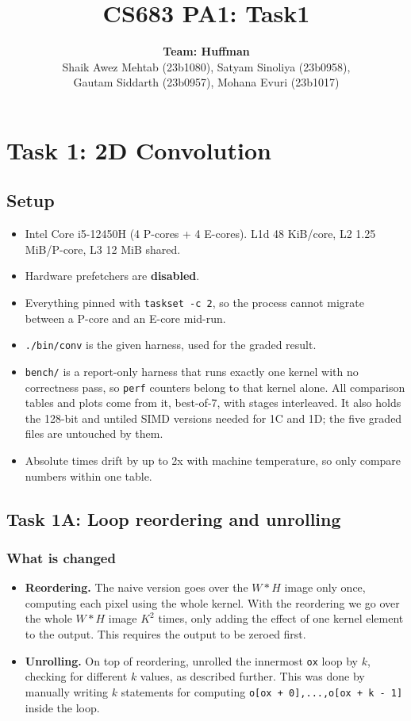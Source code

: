 \documentclass[
  10pt,
]{article}
\title{CS683 PA1: Task1}
\author{\textbf{Team: Huffman} \\[3pt]
  Shaik Awez Mehtab (23b1080), Satyam Sinoliya (23b0958), \\
  Gautam Siddarth (23b0957), Mohana Evuri (23b1017)}
\date{}
\providecommand{\tightlist}{%
  \setlength{\itemsep}{0pt}\setlength{\parskip}{0pt}}
\begin{document}
\maketitle
\section{Task 1: 2D Convolution}\label{task-1-2d-convolution}

\subsection{Setup}\label{setup}

\begin{itemize}
\tightlist
\item
  Intel Core i5-12450H (4 P-cores + 4 E-cores). L1d 48 KiB/core, L2 1.25
  MiB/P-core, L3 12 MiB shared.
\item
  Hardware prefetchers are \textbf{disabled}.
\item
  Everything pinned with \texttt{taskset\ -c\ 2}, so the process cannot
  migrate between a P-core and an E-core mid-run.
\item
  \texttt{./bin/conv} is the given harness, used for the graded result.
\item
  \texttt{bench/} is a report-only harness that runs exactly one kernel with no
  correctness pass, so \texttt{perf} counters belong to that kernel alone. All
  comparison tables and plots come from it, best-of-7, with stages interleaved.
  It also holds the 128-bit and untiled SIMD versions needed for 1C and 1D; the
  five graded files are untouched by them.
\item
  Absolute times drift by up to 2x with machine temperature, so only
  compare numbers within one table.
\end{itemize}

\subsection{Task 1A: Loop reordering and
unrolling}\label{task-1a-loop-reordering-and-unrolling}

\subsubsection{What is changed}\label{what-is-changed}

\begin{itemize}
\tightlist
\item
  \textbf{Reordering.} The naive version goes over the $W * H$ image only
  once, computing each pixel using the whole kernel. With the reordering
  we go over the whole $W * H$ image $K^2$ times, only adding the effect
  of one kernel element to the output. This requires the output to be
  zeroed first.
\item
  \textbf{Unrolling.} On top of reordering, unrolled the innermost
  \texttt{ox} loop by $k$, checking for different $k$ values, as
  described further. This was done by manually writing $k$ statements for
  computing \texttt{o[ox + 0],...,o[ox + k - 1]} inside the loop.
\end{itemize}
\end{document}
